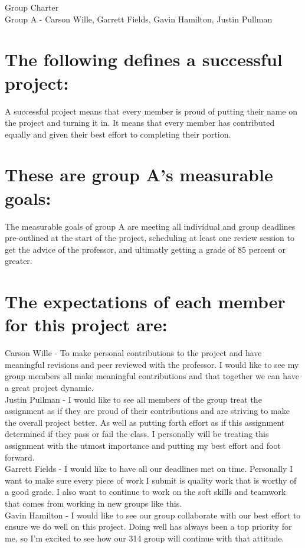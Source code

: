 \documentclass[12pt,A4paper]{article}
\begin{document}
	\begin{center}
		\Large
		Group Charter \\
		\vspace{.25 in}
		\normalsize
		Group A - Carson Wille, Garrett Fields, Gavin Hamilton, Justin Pullman
	\end{center}
\section{The following defines a successful project:}
	A successful project means that every member is proud of putting their name on the project and turning it in. It means that every member has contributed equally and given their best effort to completing their portion. 
	
\section{These are group A's measurable goals:}
	The measurable goals of group A are meeting all individual and group deadlines pre-outlined at the start of the project, scheduling at least one review session to get the advice of the professor, and ultimatly getting a grade of 85 percent or greater.
	
\section{The expectations of each member for this project are:}
	Carson Wille - To make personal contributions to the project and have meaningful revisions and peer reviewed with the professor. I would like to see my group members all make meaningful contributions and that together we can have a great project dynamic. \\
	Justin Pullman - I would like to see all members of the group treat the assignment as if they are proud of their contributions and are striving to make the overall project better.  As well as putting forth effort as if this assignment determined if they pass or fail the class. I personally will be treating this assignment with the utmost importance and putting my best effort and foot forward. \\
	Garrett Fields - I would like to have all our deadlines met on time. Personally I want to make sure every piece of work I submit is quality work that is worthy of a good grade. I also want to continue to work on the soft skills and teamwork that comes from working in new groups like this. \\
	Gavin Hamilton - I would like to see our group collaborate with our best effort to ensure we do well on this project. Doing well has always been a top priority for me, so I’m excited to see how our 314 group will continue with that attitude. \\
	
\end{document}
